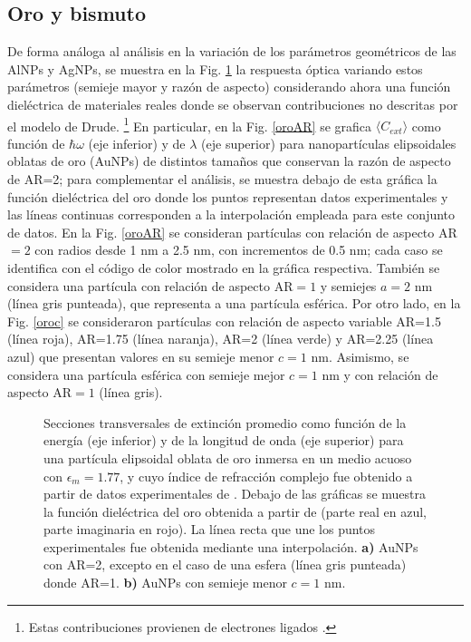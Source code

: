 \subsection*{Oro y bismuto}
De forma análoga al análisis en la variación de los parámetros geométricos de las AlNPs y AgNPs, se muestra en la Fig. \ref{oro} la respuesta óptica variando estos parámetros (semieje mayor y razón de aspecto) considerando ahora una función dieléctrica de materiales reales donde se observan contribuciones no descritas por el modelo de Drude. \footnote{Estas contribuciones provienen de electrones ligados \cite{Plasmonics}.} En particular, en la Fig. \ref{oroAR} se grafica $\langle C_{ext}\rangle$ como función de $\hbar\omega$ (eje inferior) y de $\lambda$ (eje superior) para nanopartículas elipsoidales oblatas de oro (AuNPs) de distintos tamaños que conservan la razón de aspecto de AR=2; para complementar el análisis, se muestra debajo de esta gráfica la función dieléctrica del oro donde los puntos representan datos experimentales \cite{Plata} y las líneas continuas corresponden a la interpolación empleada para este conjunto de datos. En la Fig. \ref{oroAR} se consideran partículas con relación de aspecto AR$=2$ con radios desde 1  nm a 2.5 nm, con incrementos de 0.5 nm; cada caso se identifica con el código de color mostrado en la gráfica respectiva. También se considera una partícula con relación de aspecto AR$=1$ y semiejes $a=2$ nm (línea gris punteada), que representa a una partícula esférica. Por otro lado, en la Fig. \ref{oroc} se consideraron partículas con relación de aspecto variable AR=1.5 (línea roja), AR=1.75 (línea naranja), AR=2 (línea verde) y AR=2.25 (línea azul) que presentan valores en su semieje menor $c=1\text{ nm}$. Asimismo, se considera una partícula esférica con semieje mejor $c=1\text{ nm}$ y con relación de aspecto AR$=1$ (línea gris).
\begin{figure}[H]
	\quad%
	\caption{Secciones transversales de extinción promedio como función de la energía (eje inferior) y de la longitud de onda (eje superior) para una partícula elipsoidal oblata de oro inmersa en un medio acuoso con $\epsilon_m=1.77$, y cuyo índice de refracción complejo fue obtenido a partir de datos experimentales de \cite{Plata}. Debajo de las gráficas se muestra la función dieléctrica del oro obtenida a partir de \cite{Plata} (parte real en azul, parte imaginaria en rojo). La línea recta que une los puntos experimentales fue obtenida mediante una interpolación. \textbf{a)} AuNPs con AR=2, excepto en el caso de una esfera (línea gris punteada) donde AR=1. \textbf{b)} AuNPs con semieje menor $c=1$ nm.}\label{oro}
\end{figure}

